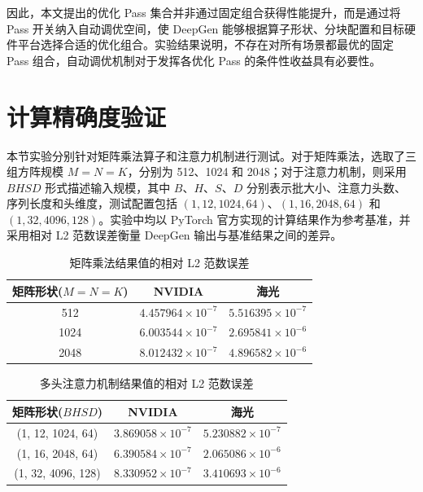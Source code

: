 因此，本文提出的优化 Pass 集合并非通过固定组合获得性能提升，而是通过将 Pass 开关纳入自动调优空间，使 DeepGen 能够根据算子形状、分块配置和目标硬件平台选择合适的优化组合。实验结果说明，不存在对所有场景都最优的固定 Pass 组合，自动调优机制对于发挥各优化 Pass 的条件性收益具有必要性。

\section{计算精确度验证}\label{precision}

本节实验分别针对矩阵乘法算子和注意力机制进行测试。对于矩阵乘法，选取了三组方阵规模 $M=N=K$，分别为 512、1024 和 2048；对于注意力机制，则采用 $BHSD$ 形式描述输入规模，其中 $B$、$H$、$S$、$D$ 分别表示批大小、注意力头数、序列长度和头维度，测试配置包括 $(1,12,1024,64)$、$(1,16,2048,64)$ 和 $(1,32,4096,128)$。实验中均以 PyTorch 官方实现的计算结果作为参考基准，并采用相对 L2 范数误差衡量 DeepGen 输出与基准结果之间的差异。

\begin{table}[htbp]
\caption{矩阵乘法结果值的相对 L2 范数误差}\label{tab:table7}
\vspace{0.5em}\centering\wuhao
\renewcommand{\arraystretch}{1.35}
\begin{tabular}{ccc}
\toprule[1.5pt]
矩阵形状($M=N=K$) & NVIDIA & 海光 \\ \midrule[1pt]
512 & $4.457964\times 10^{-7}$ & $5.516395\times 10^{-7}$ \\
1024 & $6.003544\times 10^{-7}$ & $2.695841\times 10^{-6}$ \\ 
2048 & $8.012432\times 10^{-7}$ & $4.896582\times 10^{-6}$ \\ \bottomrule[1.5pt]
\end{tabular}
\vspace{\baselineskip}
\end{table}


\begin{table}[htbp]
\caption{多头注意力机制结果值的相对 L2 范数误差}\label{tab:table8}
\vspace{0.5em}\centering\wuhao
\renewcommand{\arraystretch}{1.35}
\begin{tabular}{ccc}
\toprule[1.5pt]
矩阵形状($BHSD$) & NVIDIA & 海光 \\ \midrule[1pt]
(1, 12, 1024, 64) & $3.869058\times 10^{-7}$ & $5.230882\times 10^{-7}$ \\
(1, 16, 2048, 64) & $6.390584\times 10^{-7}$ & $2.065086\times 10^{-6}$ \\ 
(1, 32, 4096, 128) & $8.330952\times 10^{-7}$ & $3.410693\times 10^{-6}$ \\
\bottomrule[1.5pt]
\end{tabular}
\vspace{\baselineskip}
\end{table}

